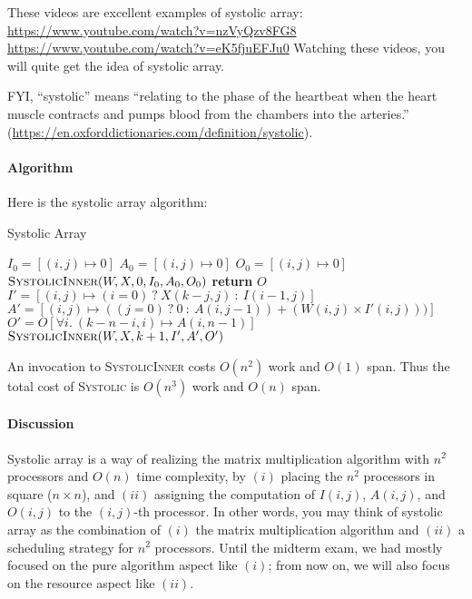 \documentclass[11pt,a4paper,oneside,microtype,nokorean]{oblivoir}
\begin{document}
These videos are excellent examples of systolic array:
\url{https://www.youtube.com/watch?v=nzVyQzv8FG8} \url{https://www.youtube.com/watch?v=eK5fjuEFJu0}
Watching these videos, you will quite get the idea of systolic array.

FYI, ``systolic'' means ``relating to the phase of the heartbeat when the heart muscle contracts and
pumps blood from the chambers into the arteries.''
(\url{https://en.oxforddictionaries.com/definition/systolic}).


\paragraph{Algorithm}

Here is the systolic array algorithm:

\begin{algorithm}
  \caption{Systolic Array}\label{systolic}
  \begin{algorithmic}[1]
     
    \State $I_0 = [(i,j) \mapsto 0]$ 
    \State $A_0 = [(i,j) \mapsto 0]$ 
    \State $O_0 = [(i,j) \mapsto 0]$ 
    \State $\Call{SystolicInner}{W,X,0,I_0,A_0,O_0}$
    \EndProcedure
    \Statex
     
    \State \textbf{return} $O$
    \EndIf
    \State $I' = [(i,j) \mapsto (i=0)~?~X(k-j,j)~:~I(i-1,j)]$
    \State $A' = [(i,j) \mapsto ((j=0)~?~0~:~A(i,j-1)) + (W(i,j) \times I'(i,j)))]$
    \State $O' = O[\forall i.~(k-n-i,i) \mapsto A(i,n-1)]$
    \State $\Call{SystolicInner}{W,X,k+1,I',A',O'}$
    \EndProcedure
  \end{algorithmic}
\end{algorithm}

An invocation to \textsc{SystolicInner} costs $O(n^2)$ work and $O(1)$ span.  Thus the total cost of
\textsc{Systolic} is $O(n^3)$ work and $O(n)$ span.


\paragraph{Discussion}

Systolic array is a way of realizing the matrix multiplication algorithm with $n^2$ processors and
$O(n)$ time complexity, by $(i)$ placing the $n^2$ processors in square ($n \times n$), and $(ii)$
assigning the computation of $I(i,j)$, $A(i,j)$, and $O(i,j)$ to the $(i,j)$-th processor.  In other
words, you may think of systolic array as the combination of $(i)$ the matrix multiplication
algorithm and $(ii)$ a scheduling strategy for $n^2$ processors.  Until the midterm exam, we had
mostly focused on the pure algorithm aspect like $(i)$; from now on, we will also focus on the
resource aspect like $(ii)$.
\end{document}

